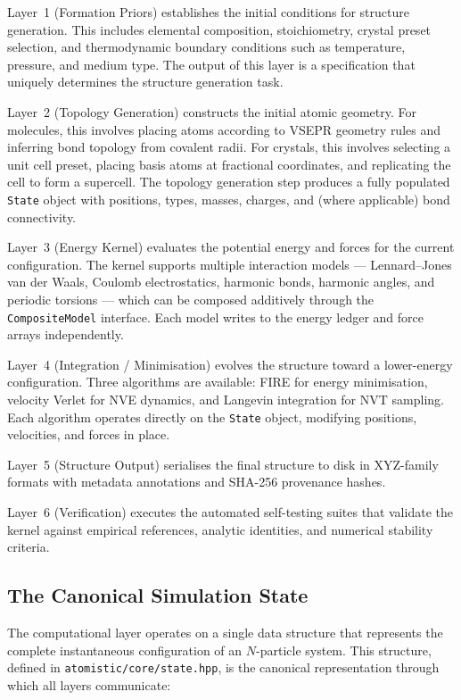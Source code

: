 \documentclass[11pt,twoside]{article}
\newcommand{\file}[1]{\texttt{#1}}
\newcommand{\type}[1]{\texttt{#1}}
\begin{document}
Layer~1 (Formation Priors) establishes the initial conditions for structure generation. This includes elemental composition, stoichiometry, crystal preset selection, and thermodynamic boundary conditions such as temperature, pressure, and medium type. The output of this layer is a specification that uniquely determines the structure generation task.

Layer~2 (Topology Generation) constructs the initial atomic geometry. For molecules, this involves placing atoms according to VSEPR geometry rules and inferring bond topology from covalent radii. For crystals, this involves selecting a unit cell preset, placing basis atoms at fractional coordinates, and replicating the cell to form a supercell. The topology generation step produces a fully populated \type{State} object with positions, types, masses, charges, and (where applicable) bond connectivity.

Layer~3 (Energy Kernel) evaluates the potential energy and forces for the current configuration. The kernel supports multiple interaction models --- Lennard--Jones van der Waals, Coulomb electrostatics, harmonic bonds, harmonic angles, and periodic torsions --- which can be composed additively through the \type{CompositeModel} interface. Each model writes to the energy ledger and force arrays independently.

Layer~4 (Integration / Minimisation) evolves the structure toward a lower-energy configuration. Three algorithms are available: FIRE for energy minimisation, velocity Verlet for NVE dynamics, and Langevin integration for NVT sampling. Each algorithm operates directly on the \type{State} object, modifying positions, velocities, and forces in place.

Layer~5 (Structure Output) serialises the final structure to disk in XYZ-family formats with metadata annotations and SHA-256 provenance hashes.

Layer~6 (Verification) executes the automated self-testing suites that validate the kernel against empirical references, analytic identities, and numerical stability criteria.

\subsection{The Canonical Simulation State}
\label{sec:state}

The computational layer operates on a single data structure that represents the complete instantaneous configuration of an $N$-particle system. This structure, defined in \file{atomistic/core/state.hpp}, is the canonical representation through which all layers communicate:
\end{document}
